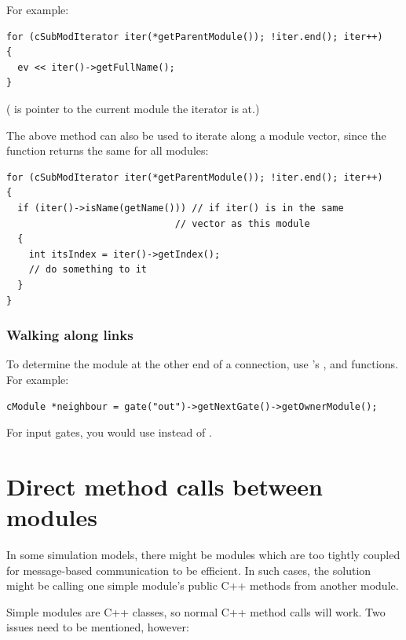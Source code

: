 For example:

\begin{verbatim}
for (cSubModIterator iter(*getParentModule()); !iter.end(); iter++)
{
  ev << iter()->getFullName();
}
\end{verbatim}

( is pointer to the current module the iterator is at.)


The above method can also be used to iterate along a module
vector, since the 
function returns the same for all modules:

\begin{verbatim}
for (cSubModIterator iter(*getParentModule()); !iter.end(); iter++)
{
  if (iter()->isName(getName())) // if iter() is in the same
                              // vector as this module
  {
    int itsIndex = iter()->getIndex();
    // do something to it
  }
}
\end{verbatim}


\subsubsection{Walking along links}

To determine the module at the other end of a connection, use
's ,  and
 functions. For example:

\begin{verbatim}
cModule *neighbour = gate("out")->getNextGate()->getOwnerModule();
\end{verbatim}

For input gates, you would use  instead of
.


\section{Direct method calls between modules}
\label{ch:simple-modules:direct-method-calls}

In some simulation models, there might be modules which are too
tightly coupled for message-based communication to be efficient.
In such cases, the solution might be calling one simple module's public
C++ methods from another module.

Simple modules are C++ classes, so normal C++ method calls will
work. Two issues need to be mentioned, however:


